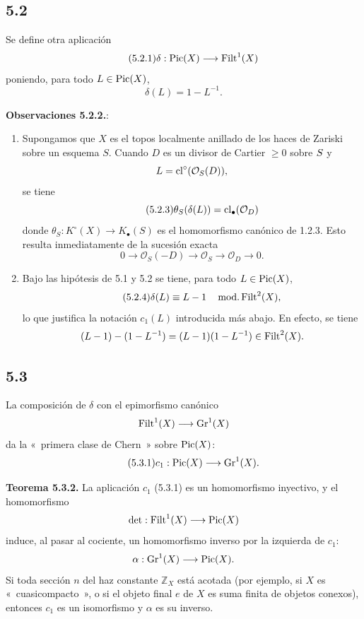 \subsection*{5.2}
Se define otra aplicación
\begin{equation}\tag{5.2.1}
 \delta:\Pic(X)\longrightarrow\Filt^1(X)
\end{equation}
poniendo, para todo \(L\in\Pic(X)\),
\[
 \delta(L)=1-L^{-1}.
\]

\textbf{Observaciones 5.2.2.}:
\begin{enumerate}[label=\alph*)]
\item Supongamos que \(X\) es el topos localmente anillado de los haces de Zariski sobre un esquema \(S\). Cuando \(D\) es un divisor de Cartier \(\geq0\) sobre \(\sisi{X}{S}\) y %
\[
 L=\cl^\circ(\mathcal O_S(D)),
\]
se tiene
\begin{equation}\tag{5.2.3}
 \theta_S(\delta(L))=\cl_\bullet(\mathcal O_D)
\end{equation}
donde \(\theta_S:K^\circ(X)\to K_\bullet(S)\) es el homomorfismo canónico de 1.2.3. Esto resulta inmediatamente de la sucesión exacta
\[
0\longrightarrow\mathcal O_S(-D)\longrightarrow\mathcal O_S\longrightarrow\mathcal O_D\longrightarrow0.
\]

\item Bajo las hipótesis de 5.1 y 5.2 se tiene, para todo \(L\in\Pic(X)\),
\begin{equation}\tag{5.2.4}
 \delta(L)\equiv L-1\quad\operatorname{mod.}\Filt^2(X),
\end{equation}
lo que justifica la notación \(c_1(L)\) introducida más abajo. En efecto, se tiene
\[
 (L-1)-(1-L^{-1})=(L-1)(1-L^{-1})\in\Filt^2(X).
\]
\end{enumerate}

\subsection*{5.3}
La composición de \(\delta\) con el epimorfismo canónico
\[
 \Filt^1(X)\longrightarrow\Gr^1(X)
\]
da la «~primera clase de Chern~» sobre \(\Pic(X)\):
\begin{equation}\tag{5.3.1}
 c_1:\Pic(X)\longrightarrow\Gr^1(X).
\end{equation}

\textbf{Teorema 5.3.2.} La aplicación \(c_1\) (5.3.1) es un homomorfismo inyectivo, y el homomorfismo
\[
 \det:\Filt^1(X)\longrightarrow\Pic(X)
\]
induce, al pasar al cociente, un homomorfismo inverso por la izquierda de \(c_1\):
\[
 \alpha:\Gr^1(X)\longrightarrow\Pic(X).
\]
Si toda sección \(n\) del haz constante \(\mathbb Z_X\) está acotada (por ejemplo, si \(X\) es «~cuasicompacto~», o si el objeto final \(e\) de \(X\) es suma finita de objetos conexos), entonces \(c_1\) es un isomorfismo y \(\alpha\) es su inverso.

